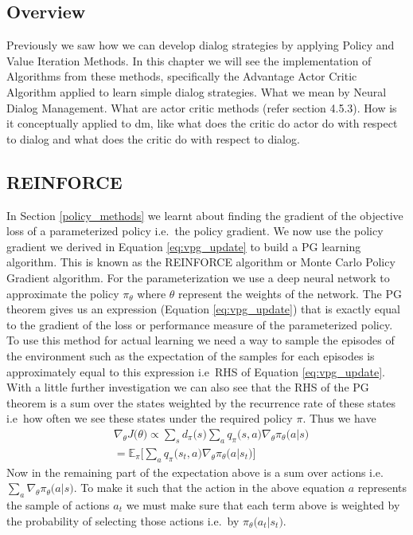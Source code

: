 \documentclass[14pt]{extarticle}
\numberwithin{equation}{section}
\begin{document}
	\subsection{Overview}
	Previously we saw how we can develop dialog strategies by applying Policy and Value Iteration Methods. In this chapter we will see the implementation of Algorithms from these methods, specifically the Advantage Actor Critic Algorithm applied to learn simple dialog strategies.	What we mean by Neural Dialog Management. What are actor critic methods (refer section 4.5.3). How is it conceptually applied to dm, like what does the critic do actor do with respect to dialog and what does the critic do with respect to dialog.
	\subsection{REINFORCE}
	In Section \ref{policy_methods} we learnt about finding the gradient of the objective loss of a parameterized policy i.e.\ the policy gradient. We now use the policy gradient we derived in Equation \ref{eq:vpg_update} to build a PG learning algorithm. This is known as the REINFORCE algorithm or Monte Carlo Policy Gradient algorithm\cite{Williams92REINFORCE}. For the parameterization we use a deep neural network to approximate the policy $\pi_{\theta}$ where $\theta$ represent the weights of the network. The PG theorem gives us an expression (Equation \ref{eq:vpg_update}) that is exactly equal to the gradient of the loss or performance measure of the parameterized policy. To use this method for actual learning we need a way to sample the episodes of the environment such as the expectation of the samples for each episodes is approximately equal to this expression i.e\ RHS of Equation \ref{eq:vpg_update}. With a little further investigation we can also see that the RHS of the PG theorem is a sum over the states weighted by the recurrence rate of these states i.e\ how often we see these states under the required policy $\pi$. Thus we have 
	\begin{align}
	&\nabla_{\theta}J\big(\theta\big)\propto \sum_{s}d_{\pi}\big(s\big)\sum_{a}q_{\pi}\big(s,a\big)\nabla_{\theta} \pi_{\theta}\big(a|s\big)\nonumber\\
	& = \mathbb{E}_{\pi}\big[\sum_{a}q_{\pi}\big(s_t,a\big)\nabla_{\theta}\pi_{\theta}\big(a|s_t\big)\big]\label{eq:pg-expectation}
	\end{align}
	Now in the remaining part of the expectation above is a sum over actions i.e.\ $\sum_{a}\nabla_{\theta}\pi_{\theta}\big(a|s\big)$. To make it such that the action in the above equation $a$ represents the sample of actions $a_t$ we must make sure that each term above is weighted by the probability of selecting those actions i.e.\ by $\pi_{\theta}\big(a_t|s_t\big)$.
\end{document}
